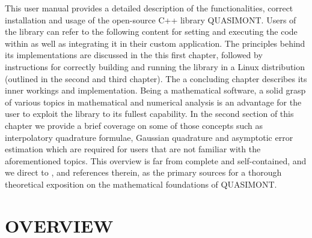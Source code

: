 \documentclass[a4paper, twosided]{book}
\begin{document}
This user manual provides a detailed description of the functionalities, correct installation and usage of the open-source C++ library QUASIMONT. Users of the library can refer to the following content for setting and executing the code within as well as integrating it in their custom application. The principles behind its implementations are discussed in the this first chapter, followed by instructions for correctly building and running the library in a Linux distribution (outlined in the second and third chapter). The a concluding chapter describes its inner workings and implementation. Being a mathematical software, a solid grasp of various topics in mathematical and numerical analysis is an advantage for the user to exploit the library to its fullest capability. In the second section of this chapter we provide a brief coverage on some of those concepts such as interpolatory quadrature formulae, Gaussian quadrature and asymptotic error estimation which are required for users that are not familiar with the aforementioned topics. This overview is far from complete and self-contained, and we direct to \cite{Lombardi09, Lombardi21}, and references therein, as the primary sources for a thorough theoretical exposition on the mathematical foundations of QUASIMONT.

\section[Overview]{\changefont OVERVIEW}\label{Sec1.1}
\end{document}
